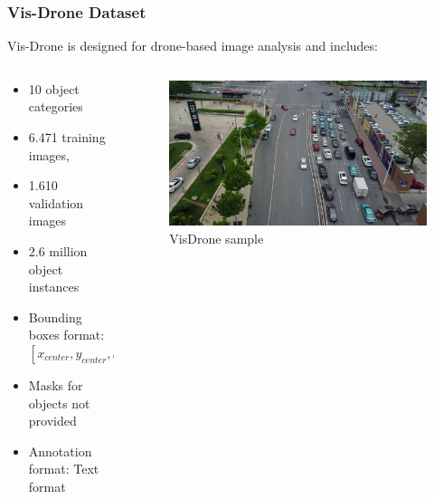 \documentclass{beamer}
\begin{document}
\begin{frame}[t]
  \frametitle{Vis-Drone Dataset}
  Vis-Drone is designed for drone-based image analysis and includes:

  \begin{columns}
    \begin{column}{0.5\textwidth}
      \begin{itemize}
        \item 10 object categories
        \item 6.471 training images, 
        \item 1.610 validation images
        \item 2.6 million object instances
        \item Bounding boxes format: $[x_{center}, y_{center}, height, width]$
        \item Masks for objects not provided
        \item Annotation format: Text format
      \end{itemize}
    \end{column}

    \begin{column}{0.5\textwidth}
      \centering
      \begin{figure}
        \includegraphics[scale=0.085]{Figures/vis_example.jpg}
        \caption{VisDrone sample}
        \label{fig:vis-ex}
      \end{figure}
    \end{column}
  \end{columns}
\end{frame}
\end{document}
